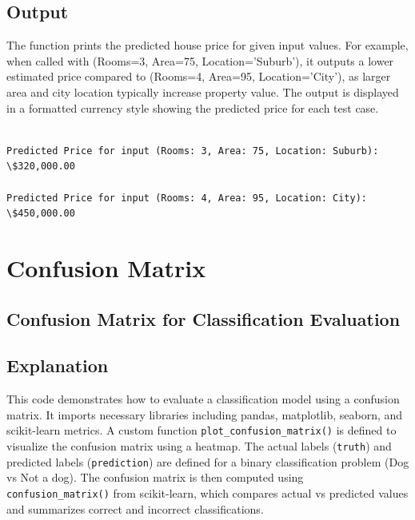 \documentclass[11pt]{article}
\begin{document}
\subsection*{Output}
The function prints the predicted house price for given input values. For example, when called with (Rooms=3, Area=75, Location='Suburb'), it outputs a lower estimated price compared to (Rooms=4, Area=95, Location='City'), as larger area and city location typically increase property value. The output is displayed in a formatted currency style showing the predicted price for each test case.

\begin{Verbatim}[commandchars=\\\{\}]

Predicted Price for input (Rooms: 3, Area: 75, Location: Suburb): \$320,000.00

Predicted Price for input (Rooms: 4, Area: 95, Location: City): \$450,000.00
    \end{Verbatim}

\newpage
\section{Confusion Matrix}\label{confusion-matrix}

\subsection{Confusion Matrix for Classification Evaluation}

\subsection*{Explanation}
This code demonstrates how to evaluate a classification model using a confusion matrix. It imports necessary libraries including pandas, matplotlib, seaborn, and scikit-learn metrics. A custom function \texttt{plot\_confusion\_matrix()} is defined to visualize the confusion matrix using a heatmap. The actual labels (\texttt{truth}) and predicted labels (\texttt{prediction}) are defined for a binary classification problem (Dog vs Not a dog). The confusion matrix is then computed using \texttt{confusion\_matrix()} from scikit-learn, which compares actual vs predicted values and summarizes correct and incorrect classifications.
\end{document}
